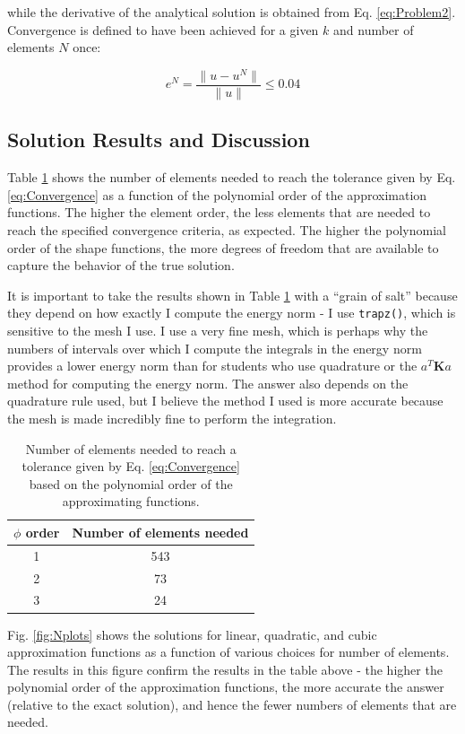 \documentclass[10pt]{article}
\begin{document}
while the derivative of the analytical solution is obtained from Eq. \eqref{eq:Problem2}. Convergence is defined to have been achieved for a given \(k\) and number of elements \(N\) once:

\begin{equation}
\label{eq:Convergence}
e^N=\frac{\|u-u^N\|}{\|u\|} \leq 0.04
\end{equation}

\subsection{Solution Results and Discussion}

Table \ref{table:orders} shows the number of elements needed to reach the tolerance given by Eq. \eqref{eq:Convergence} as a function of the polynomial order of the approximation functions. The higher the element order, the less elements that are needed to reach the specified convergence criteria, as expected. The higher the polynomial order of the shape functions, the more degrees of freedom that are available to capture the behavior of the true solution. 

It is important to take the results shown in Table \ref{table:orders} with a ``grain of salt'' because they depend on how exactly I compute the energy norm - I use \texttt{trapz()}, which is sensitive to the mesh I use. I use a very fine mesh, which is perhaps why the numbers of intervals over which I compute the integrals in the energy norm provides a lower energy norm than for students who use quadrature or the \(a^T\textbf{K}a\) method for computing the energy norm. The answer also depends on the quadrature rule used, but I believe the method I used is more accurate because the mesh is made incredibly fine to perform the integration.

\begin{table}[H]
\caption{Number of elements needed to reach a tolerance given by Eq. \eqref{eq:Convergence} based on the polynomial order of the approximating functions.}
\centering
\begin{tabular}{c c}
\hline\hline
\(\phi\) order & Number of elements needed\\ [0.5ex]
\hline
1 & 543\\
2 & 73\\
3 & 24\\
\hline
\end{tabular}
\label{table:orders}
\end{table}

Fig. \ref{fig:Nplots} shows the solutions for linear, quadratic, and cubic approximation functions as a function of various choices for number of elements. The results in this figure confirm the results in the table above - the higher the polynomial order of the approximation functions, the more accurate the answer (relative to the exact solution), and hence the fewer numbers of elements that are needed. 
\end{document}
